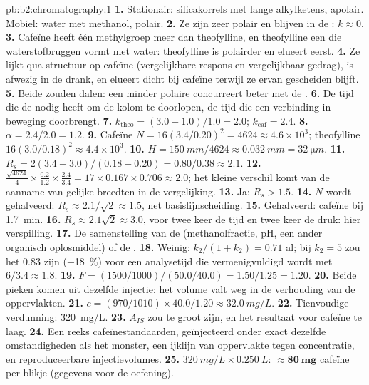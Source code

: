 \begin{solution}{pb:b2:chromatography:1}
\textbf{1.} Stationair: silicakorrels met lange alkylketens, apolair. Mobiel: water met
methanol, polair.
\textbf{2.} Ze zijn zeer polair en blijven in de : $k \approx 0$.
\textbf{3.} Cafeïne heeft één methylgroep meer dan theofylline, en theofylline een  die
waterstofbruggen vormt met water: theofylline is polairder en elueert eerst.
\textbf{4.} Ze lijkt qua structuur op cafeïne (vergelijkbare respons en vergelijkbaar gedrag), is afwezig in de drank, en elueert
dicht bij cafeïne terwijl ze ervan gescheiden blijft.
\textbf{5.} Beide zouden dalen: een minder polaire  concurreert beter met de .
\textbf{6.} De tijd die de  nodig heeft om de kolom te doorlopen, de tijd die een verbinding in beweging doorbrengt.
\textbf{7.} $k_{\mathrm{theo}} = (3.0 - 1.0)/1.0 = 2.0$; $k_{\mathrm{caf}} = 2.4$.
\textbf{8.} $\alpha = 2.4/2.0 = 1.2$.
\textbf{9.} Cafeïne $N = 16(3.4/0.20)^2 = 4624 \approx 4.6 \times 10^3$; theofylline $16(3.0/0.18)^2
\approx 4.4 \times 10^3$.
\textbf{10.} $H = \qty{150}{mm}/4624 \approx \qty{0.032}{mm} = \qty{32}{\micro m}$.
\textbf{11.} $R_s = 2(3.4 - 3.0)/(0.18 + 0.20) = 0.80/0.38 \approx 2.1$.
\textbf{12.} $\frac{\sqrt{4624}}{4} \times \frac{0.2}{1.2} \times \frac{2.4}{3.4} = 17 \times 0.167 \times
0.706 \approx 2.0$; het kleine verschil komt van de aanname van gelijke breedten in de vergelijking.
\textbf{13.} Ja: $R_s > 1.5$.
\textbf{14.} $N$ wordt gehalveerd: $R_s \approx 2.1/\sqrt2 \approx 1.5$, net basislijnscheiding.
\textbf{15.} Gehalveerd: cafeïne bij \qty{1.7}{min}.
\textbf{16.} $R_s \approx 2.1\sqrt2 \approx 3.0$, voor twee keer de tijd en twee keer de druk: hier verspilling.
\textbf{17.} De samenstelling van de  (methanolfractie, pH, een ander organisch oplosmiddel) of de
.
\textbf{18.} Weinig: $k_2/(1 + k_2) = 0.71$ al; bij $k_2 = 5$ zou het 0.83 zijn (+18~\%) voor een
analysetijd die vermenigvuldigd wordt met $6/3.4 \approx 1.8$.
\textbf{19.} $F = (1500/1000)/(50.0/40.0) = 1.50/1.25 = 1.20$.
\textbf{20.} Beide pieken komen uit dezelfde injectie: het volume valt weg in de verhouding van de oppervlakten.
\textbf{21.} $c = (970/1010) \times 40.0/1.20 \approx \qty{32.0}{mg/L}$.
\textbf{22.} Tienvoudige verdunning: \qty{320}{mg/L}.
\textbf{23.} $A_{IS}$ zou te groot zijn, en het resultaat voor cafeïne te laag.
\textbf{24.} Een reeks cafeïnestandaarden, geïnjecteerd onder exact dezelfde omstandigheden als het monster, een
ijklijn van oppervlakte tegen concentratie, en reproduceerbare injectievolumes.
\textbf{25.} $\qty{320}{mg/L} \times \qty{0.250}{L}$: $\boldsymbol{\approx \qty{80}{mg}}$ cafeïne per blikje (gegevens
voor de oefening).
\end{solution}
